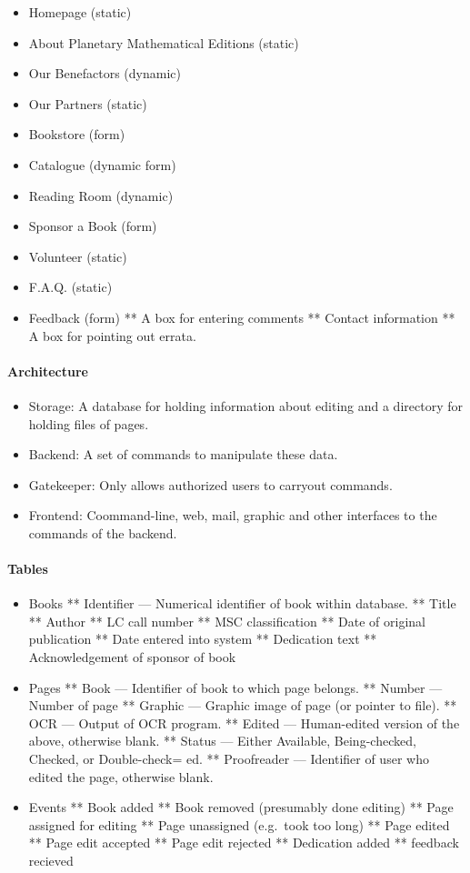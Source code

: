 \begin{itemize}
\begin{itemize}
\begin{itemize}
\item
  Homepage (static)
\item
  About Planetary Mathematical Editions (static)
\item
  Our Benefactors (dynamic)
\item
  Our Partners (static)
\item
  Bookstore (form)
\item
  Catalogue (dynamic form)
\item
  Reading Room (dynamic)
\item
  Sponsor a Book (form)
\item
  Volunteer (static)
\item
  F.A.Q. (static)
\item
  Feedback (form) ** A box for entering comments ** Contact information
  ** A box for pointing out errata.
\end{itemize}

\paragraph{Architecture}

\begin{itemize}
\item
  Storage: A database for holding information about editing and a
  directory for holding files of pages.
\item
  Backend: A set of commands to manipulate these data.
\item
  Gatekeeper: Only allows authorized users to carryout commands.
\item
  Frontend: Coommand-line, web, mail, graphic and other interfaces to
  the commands of the backend.
\end{itemize}

\paragraph{Tables}

\begin{itemize}
\item
  Books ** Identifier --- Numerical identifier of book within database.
  ** Title ** Author ** LC call number ** MSC classification ** Date of
  original publication ** Date entered into system ** Dedication text **
  Acknowledgement of sponsor of book
\item
  Pages ** Book --- Identifier of book to which page belongs. ** Number
  --- Number of page ** Graphic --- Graphic image of page (or pointer to
  file). ** OCR --- Output of OCR program. ** Edited --- Human-edited
  version of the above, otherwise blank. ** Status --- Either Available,
  Being-checked, Checked, or Double-check= ed. ** Proofreader ---
  Identifier of user who edited the page, otherwise blank.
\item
  Events ** Book added ** Book removed (presumably done editing) ** Page
  assigned for editing ** Page unassigned (e.g.~took too long) ** Page
  edited ** Page edit accepted ** Page edit rejected ** Dedication added
  ** feedback recieved
\end{itemize}


\end{itemize}
\end{itemize}
